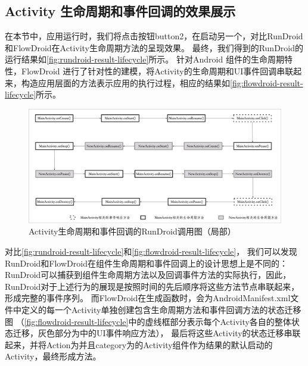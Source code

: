 \subsection{Activity 生命周期和事件回调的效果展示}


在本节中，应用运行时，我们将点击按钮button2，在启动另一个，对比RunDroid和FlowDroid在Activity生命周期方法的呈现效果。
最终，我们得到的RunDroid的运行结果如\autoref{fig:rundroid-result-lifecycle}所示。
针对Android 组件的生命周期特性，FlowDroid 进行了针对性的建模，将Activity的生命周期和UI事件回调串联起来，构造应用层面的方法表示应用的执行过程，相应的结果如\autoref{fig:flowdroid-result-lifecycle}所示。


\begin{figure}[!ht]
	\centering
	\includegraphics[width=\textwidth]{./Figures/android-lifecycle-rundroid.png}
	\caption{Activity生命周期和事件回调的RunDroid调用图（局部）}
	\label{fig:rundroid-result-lifecycle}
\end{figure}


对比\autoref{fig:rundroid-result-lifecycle}和\autoref{fig:flowdroid-result-lifecycle}，
我们可以发现RunDroid和FlowDroid在组件生命周期和事件回调上的设计思想上是不同的：
RunDroid可以捕获到组件生命周期方法以及回调事件方法的实际执行，因此，RunDroid对于上述行为的展现是按照时间的先后顺序将这些方法节点串联起来，形成完整的事件序列。
而FlowDroid在生成函数时，会为AndroidManifest.xml文件中定义的每一个Activity单独创建包含生命周期方法和事件回调方法的状态迁移图
（\autoref{fig:flowdroid-result-lifecycle}中的虚线框部分表示每个Activity各自的整体状态迁移，灰色部分为中的UI事件响应方法），
最后将这些Activity的状态迁移串联起来，并将Action为并且category为的Activity组件作为结果的默认启动的Activity，最终形成方法。


